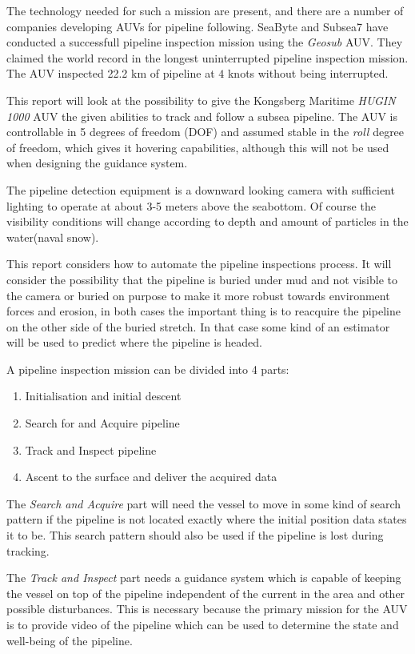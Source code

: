 	The technology needed for such a mission are present, and there are a number of companies developing
	AUVs for pipeline following. SeaByte and Subsea7 have conducted a successfull pipeline inspection
	mission using the \textit{Geosub} AUV. They claimed the world record in the longest uninterrupted
	pipeline inspection mission. The AUV inspected 22.2 km of pipeline at $4$ knots without being
	interrupted. \cite{Seabyte}
	
	This report will look at the possibility to give the Kongsberg Maritime \textit{HUGIN 1000} AUV the
	given abilities to track and follow a subsea pipeline. The AUV is controllable in 5 degrees 
	of freedom (DOF) and assumed stable in the \textit{roll} degree of freedom, which gives it
	hovering capabilities, although this will not be used when designing the guidance system.

	The pipeline detection equipment is a downward looking camera with sufficient lighting to operate at about
	3-5 meters above the seabottom. Of course the visibility conditions will change according to depth and
	amount of particles in the water(naval snow). 

	This report considers how to automate the pipeline inspections process. It will consider the
	possibility that the pipeline is buried under mud and not visible to the camera or buried on purpose
	to make it more robust towards environment forces and erosion, in both cases the important thing 
	is to reacquire the pipeline on the other side of the buried stretch. In that case some kind of an
	estimator will be used to predict where the pipeline is headed.
	
	A pipeline inspection mission can be divided into 4 parts:
	\begin{enumerate}
	 \item Initialisation and initial descent
	 \item Search for and Acquire pipeline
	 \item Track and Inspect pipeline
	 \item Ascent to the surface and deliver the acquired data
	\end{enumerate}
	
	The \textit{Search and Acquire} part will need the vessel to move in some kind of search pattern if
	the pipeline is not located exactly where the initial position data states it to be. This search
	pattern should also be used if the pipeline is lost during tracking. 
	
	The \textit{Track and Inspect} part needs a guidance system which is capable of keeping the vessel 
	on top of the pipeline independent of the current in the area and other possible disturbances. This is
	necessary because the primary mission for the AUV is to provide video of the pipeline which can be
	used to determine the state and well-being of the pipeline.
	
